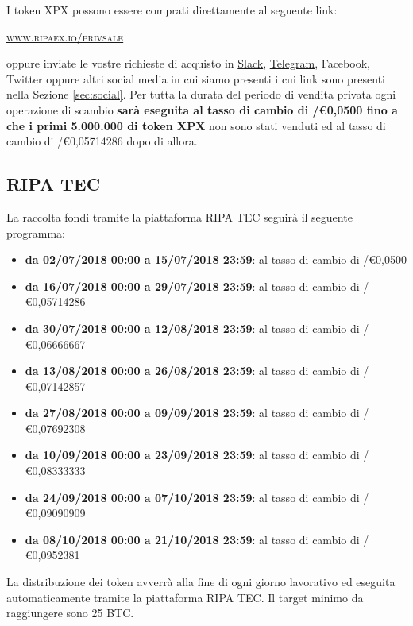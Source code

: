 \documentclass[11pt,fleqn]{book} %
\begin{document}
I token XPX possono essere comprati direttamente al seguente link:
\begin{center}
	\href{https://www.ripaex.io/privsale}{\textsc{www.ripaex.io/privsale}}
\end{center}

oppure inviate le vostre richieste di acquisto in
\href{https://join.slack.com/t/ripaex/shared_invite/enQtMzM4NzUwNjU4OTQ0LTY3MDJmMTdhYTNlZjJlNGUxNzM1YjUwYjgyYjZlMDJmOTg3NTIzNThmNTYyMGQ3ODBkOTRmYzk3Y2Y4MzBkOTY}{Slack}, 
\href{https://t.me/ripaex}{Telegram}, Facebook, Twitter oppure altri social media in cui siamo presenti
i cui link sono presenti nella Sezione \ref{sec:social}.
Per tutta la durata del periodo di vendita privata ogni operazione di scambio \textbf{sarà eseguita al tasso di cambio di
\PHP/\euro0,0500 fino a che i primi 5.000.000 di token XPX} non sono stati venduti ed al tasso di cambio di \PHP/\euro0,05714286 dopo di allora.

\subsection{RIPA TEC}
La raccolta fondi tramite la piattaforma RIPA TEC seguirà il seguente programma:
\begin{itemize}
	\item \textbf{da 02/07/2018 00:00 a 15/07/2018 23:59}: al tasso di cambio di \PHP/\euro0,0500
	\item \textbf{da 16/07/2018 00:00 a 29/07/2018 23:59}: al tasso di cambio di \PHP/\euro0,05714286
	\item \textbf{da 30/07/2018 00:00 a 12/08/2018 23:59}: al tasso di cambio di \PHP/\euro0,06666667
	\item \textbf{da 13/08/2018 00:00 a 26/08/2018 23:59}: al tasso di cambio di \PHP/\euro0,07142857
	\item \textbf{da 27/08/2018 00:00 a 09/09/2018 23:59}: al tasso di cambio di \PHP/\euro0,07692308
	\item \textbf{da 10/09/2018 00:00 a 23/09/2018 23:59}: al tasso di cambio di \PHP/\euro0,08333333
	\item \textbf{da 24/09/2018 00:00 a 07/10/2018 23:59}: al tasso di cambio di \PHP/\euro0,09090909
	\item \textbf{da 08/10/2018 00:00 a 21/10/2018 23:59}: al tasso di cambio di \PHP/\euro0,0952381
\end{itemize}
\vspace{5mm}
La distribuzione dei token avverrà alla fine di ogni giorno lavorativo ed eseguita automaticamente
tramite la piattaforma RIPA TEC. Il target minimo da raggiungere sono 25 BTC.\\
\end{document}
